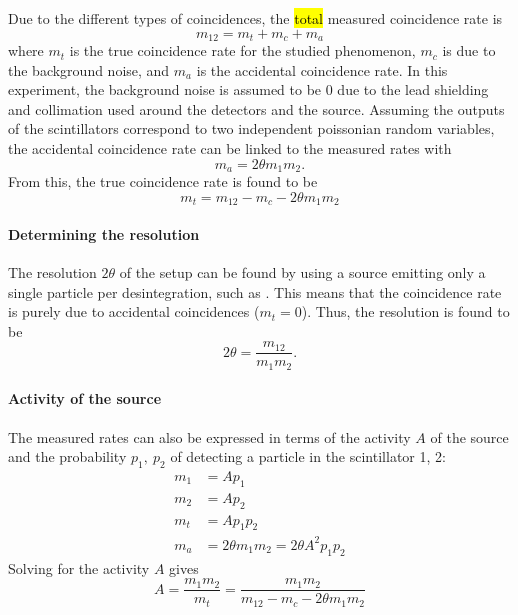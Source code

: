 Due to the different types of coincidences, the \hl{total} measured coincidence rate is
\begin{equation}
    m_{12} = m_t + m_c + m_a
\end{equation}
where \(m_t\) is the true coincidence rate for the studied phenomenon, \(m_c\) is due to the background noise, and \(m_a\) is the accidental coincidence rate. In this experiment, the background noise is assumed to be \(0\) due to the lead shielding and collimation used around the detectors and the source. Assuming the outputs of the scintillators correspond to two independent poissonian random variables, the accidental coincidence rate can be linked to the measured rates with
\begin{equation}
    m_a = 2\theta m_1 m_2.
\end{equation}
From this, the true coincidence rate is found to be
\begin{equation}
    m_t = m_{12} - m_c - 2\theta m_1 m_2
\end{equation}

\paragraph{Determining the resolution}
The resolution \(2 \theta\) of the setup can be found by using a source emitting only a single particle per desintegration, such as \cesium. This means that the coincidence rate is purely due to accidental coincidences (\(m_t = 0\)). Thus, the resolution is found to be
\begin{equation} \label{eq:coincidence_time_resolution}
    2\theta = \frac{m_{12}}{m_1 m_2}.
\end{equation}

\paragraph{Activity of the source}
The measured rates can also be expressed in terms of the activity \(A\) of the source and the probability \(p_1,\ p_2\) of detecting a particle in the scintillator 1, 2:
\begin{equation}
    \begin{aligned}
        m_1 &= A p_1 \\
        m_2 &= A p_2 \\
        m_t &= A p_1 p_2 \\
        m_a &= 2\theta m_1 m_2 = 2\theta A^2 p_1 p_2
    \end{aligned}
\end{equation}
Solving for the activity \(A\) gives
\begin{equation} \label{eq:activity}
    A = \frac{m_1 m_2}{m_t} = \frac{m_1 m_2}{m_{12} - m_c - 2\theta m_1 m_2}
\end{equation}

